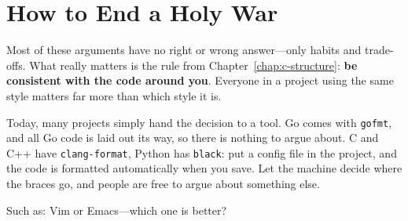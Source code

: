 \section{How to End a Holy War}

Most of these arguments have no right or wrong answer---only habits and trade-offs. What really matters is the rule from Chapter~\ref{chap:c-structure}: \textbf{be consistent with the code around you}. Everyone in a project using the same style matters far more than which style it is.

Today, many projects simply hand the decision to a tool. Go comes with \texttt{gofmt}, and all Go code is laid out its way, so there is nothing to argue about. C and C++ have \texttt{clang-format}, Python has \texttt{black}: put a config file in the project, and the code is formatted automatically when you save. Let the machine decide where the braces go, and people are free to argue about something else.

Such as: Vim or Emacs---which one is better?
